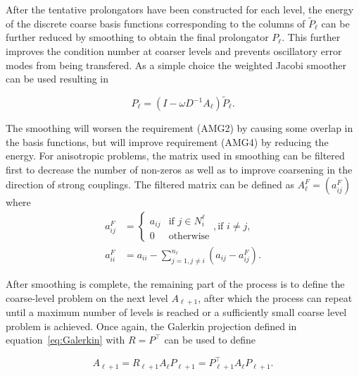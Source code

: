 After the tentative prolongators have been constructed for each level, the energy of the discrete coarse basis functions corresponding to the columns of $\tilde{P}_\ell$ can be further reduced by smoothing to obtain the final prolongator $P_\ell$. This further improves the condition number at coarser levels and prevents oscillatory error modes from being transfered. As a simple choice the weighted Jacobi smoother can be used resulting in

\begin{equation}
	\label{eq:P_smoothing}
	P_\ell = (I - \omega D^{-1}A_\ell)\tilde{P}_\ell.
\end{equation}

The smoothing will worsen the requirement (AMG2) by causing some overlap in the basis functions, but will improve requirement (AMG4) by reducing the energy. For anisotropic problems, the matrix used in smoothing can be filtered first to decrease the number of non-zeros as well as to improve coarsening in the direction of strong couplings. The filtered matrix can be defined as $A_\ell^F = \left(a_{ij}^F\right)$ where
\begin{equation}
	\begin{aligned}
	a_{ij}^F &=
	\begin{cases}
		a_{ij} & \text{if $j \in N_i^\ell$} \\
		0 & \text{otherwise}
	\end{cases}, \text{if $i \neq j$}, \\
	a_{ii}^F & =  a_{ii} - \displaystyle \sum_{j=1, j\neq i}^{n_\ell}{\left(a_{ij} - a_{ij}^F\right)}.
	\end{aligned}
\end{equation}

After smoothing is complete, the remaining part of the process is to define the coarse-level problem on the next level $A_{\ell+1}$, after which the process can repeat until a maximum number of levels is reached or a sufficiently small coarse level problem is achieved. Once again, the Galerkin projection defined in equation~\ref{eq:Galerkin} with $R = P^\top$ can be used to define

\begin{equation}
	A_{\ell+1} = R_{\ell+1} A_\ell P_{\ell+1} = P_{\ell+1}^\top A_\ell P_{\ell+1}.
\end{equation}


